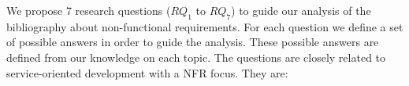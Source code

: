
% 

We propose 7 research questions ($RQ_1$ to $RQ_7$) to guide our analysis of the
bibliography about non-functional requirements. 
For each question we define a set of possible answers in order to guide
the analysis.
These possible answers are defined from our knowledge on each topic. 
The questions are closely related to service-oriented development with a NFR focus.
They are:
